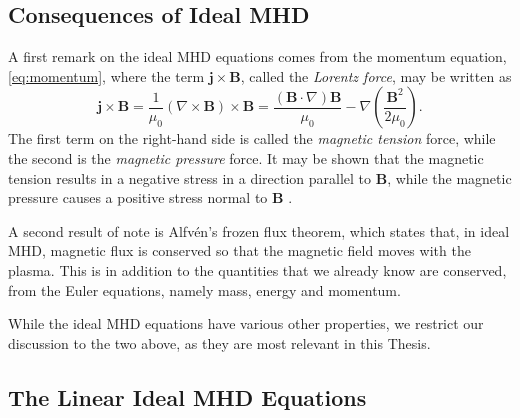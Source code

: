 \subsection{Consequences of Ideal MHD}
\label{subsec:conseq}


A first remark on the ideal MHD equations comes from the momentum equation, \eqref{eq:momentum}, where the term $\mathbf{j} \times \mathbf{B}$, called the \textit{Lorentz force}, may be written as
%
\begin{equation}
\label{eq:lorentz}
\mathbf{j} \times \mathbf{B}
= \frac{1}{\mu_0} ( \nabla \times \mathbf B ) \times \mathbf{B}
= \frac{ ( \mathbf{B} \cdot \nabla ) \mathbf{B}}{\mu_0}
- \nabla \left( \frac{\mathbf{B}^2}{2 \mu_0} \right).
\end{equation}
%
The first term on the right-hand side is called the \textit{magnetic tension} force, while the second is the \textit{magnetic pressure} force.
It may be shown that the magnetic tension results in a negative stress in a direction parallel to $\mathbf{B}$, while the magnetic pressure causes a positive stress normal to $\mathbf{B}$ \citep{Goedbloed2004}.

A second result of note is Alfv\'en's frozen flux theorem, which states that, in ideal MHD, magnetic flux is conserved so that the magnetic field moves with the plasma.
This is in addition to the quantities that we already know are conserved, from the Euler equations, namely mass, energy and momentum.

While the ideal MHD equations have various other properties, we restrict our discussion to the two above, as they are most relevant in this Thesis.


\subsection{The Linear Ideal MHD Equations}
\label{subsec:linearmhd}

